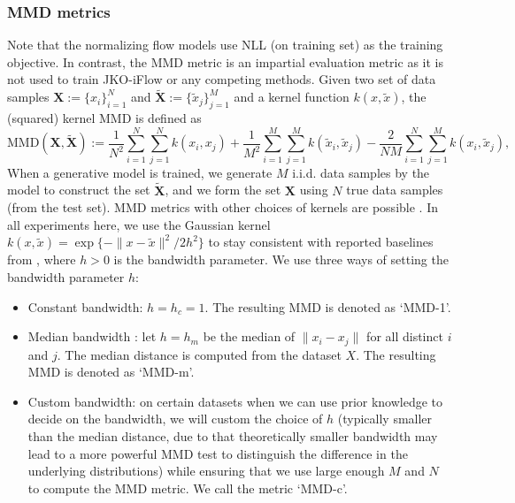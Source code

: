 \documentclass{article}
\theoremstyle{remark}
\theoremstyle{plain}
\newcommand{\JKO}{JKO-iFlow}
\begin{document}
{\subsubsection{MMD metrics}\label{sec:MMD_metrics}


Note that the normalizing flow models use NLL (on training 
set) as the training objective. 
In contrast, the MMD metric is an impartial evaluation metric as it is not used to train \JKO{} or any competing methods.
Given two set of data samples $\boldsymbol{X}:=\{x_i\}_{i=1}^N$ and $\boldsymbol{\tilde{X}}:=\{\tilde{x}_j\}_{j=1}^M$ and a kernel function $k(x,\tilde{x})$, the (squared) kernel MMD \citep{Gretton2012AKT} is defined as 
\begin{equation}\label{MMD}
    \text{MMD}(\boldsymbol{X},\boldsymbol{\tilde{X}}):=\frac{1}{N^2}\sum_{i=1}^N \sum_{j=1}^N k(x_i,x_j) + \frac{1}{M^2}\sum_{i=1}^M \sum_{j=1}^M k(\tilde{x}_i,\tilde{x}_j)
    - \frac{2}{NM}\sum_{i=1}^N \sum_{j=1}^M k(x_i,\tilde{x}_j), 
\end{equation}
When a generative model is trained, 
we generate $M$ i.i.d. data samples by the model to construct the set $\boldsymbol{\tilde{X}}$,
and we form the set $\boldsymbol{X}$ using $N$ true data samples (from the test set). 
MMD metrics with other choices of kernels are possible \cite{gretton2012optimal,sutherland2017generative,schrab2023MMD}. 
In all experiments here, we use the Gaussian kernel 
$k(x,\tilde{x}) =\exp \{-\|x-\tilde{x}\|^2/2h^2\}$ to stay consistent with reported baselines from \citep{OT-Flow}, where $h > 0$ is the bandwidth parameter.
We use three ways of setting the bandwidth parameter $h$:
\begin{itemize}
    \item Constant bandwidth: $h = h_c =1$.
    The resulting MMD is denoted as `MMD-1'. 
    
    \item Median bandwidth \citep{Gretton2012AKT}:
    let $h = h_m$ be the median of $\|x_i-x_j\|$ for all distinct $i$ and $j$.
    The median distance is computed from the dataset $X$. The resulting MMD is denoted as `MMD-m'.
    
    \item Custom bandwidth: on certain datasets when we can use prior knowledge to decide on the bandwidth, we will custom the choice of $h$ (typically smaller than the median distance, due to that theoretically smaller bandwidth may lead to a more powerful MMD test to distinguish the difference in the underlying distributions) while ensuring that we use large enough $M$ and $N$ to compute the MMD metric. 
    We call the metric `MMD-c'. 
\end{itemize}

}
\end{document}
